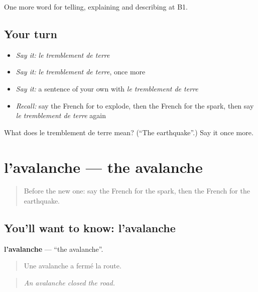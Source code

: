 \begin{grammarlens}[title={What you've built}]
One more word for telling, explaining and describing at B1.
\end{grammarlens}

\subsection*{Your turn}
\begin{itemize}
\raggedright
  \item \emph{Say it:} \emph{le tremblement de terre}
  \item \emph{Say it:} \emph{le tremblement de terre}, once more
  \item \emph{Say it:} a sentence of your own with \emph{le tremblement de terre}
  \item \emph{Recall:} say the French for to explode, then the French for the spark, then say \emph{le tremblement de terre} again
\end{itemize}

\begin{tcolorbox}[breakable,colback=teal!4,colframe=teal!35!black,title={Before you move on}]
What does le tremblement de terre mean? (\textquotedblleft{}The earthquake\textquotedblright{}.) Say it once more.
\end{tcolorbox}
\section[l'avalanche]{l'avalanche — the avalanche}

\label{lesson:FR-C303-avalanche}



\begin{quote}
Before the new one: say the French for the spark, then the French for the earthquake.
\end{quote}

\subsection*{You'll want to know: l'avalanche}
\textbf{l'avalanche} — \textquotedblleft{}the avalanche\textquotedblright{}.

\begin{quote}
Une avalanche a fermé la route.
\end{quote}

\begin{quote}
\emph{An avalanche closed the road.}
\end{quote}

